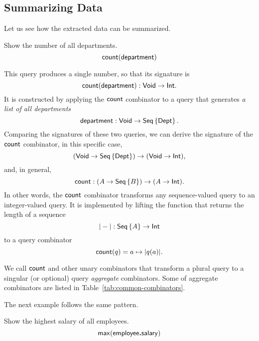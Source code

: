 \subsection*{Summarizing Data}

Let us see how the extracted data can be summarized.

\begin{demo}
    \label{ex:count-department}
    Show the number of all departments.
    \begin{equation*}
        \textup{\textsf{count}}(\textup{\textsf{department}})
    \end{equation*}
\end{demo}

This query produces a single number, so that its signature is
\begin{equation*}
    \textup{\textsf{count}}(\textup{\textsf{department}}) : \textup{\textsf{Void}} \to \textup{\textsf{Int}}.
\end{equation*}
It is constructed by applying the $\textup{\textsf{count}}$ combinator to a query that generates
\emph{a list of all departments}
\begin{equation*}
    \textup{\textsf{department}} : \textup{\textsf{Void}} \to \textup{\textsf{Seq}}\left\{\textup{\textsf{Dept}}\right\}.
\end{equation*}
Comparing the signatures of these two queries, we can derive the signature of
the $\textup{\textsf{count}}$ combinator, in this specific case,
\begin{equation*}
    (\textup{\textsf{Void}} \to \textup{\textsf{Seq}}\left\{\textup{\textsf{Dept}}\right\}) \to (\textup{\textsf{Void}} \to \textup{\textsf{Int}}),
\end{equation*}
and, in general,
\begin{equation*}
    \textup{\textsf{count}}: (A \to \textup{\textsf{Seq}}\left\{B\right\}) \to (A \to \textup{\textsf{Int}}).
\end{equation*}
In other words, the $\textup{\textsf{count}}$ combinator transforms any sequence-valued query
to an integer-valued query.  It is implemented by lifting the function that
returns the length of a sequence
\begin{equation*}
    |-| : \textup{\textsf{Seq}}\left\{A\right\} \to \textup{\textsf{Int}}
\end{equation*}
to a query combinator
\begin{equation*}
    \textup{\textsf{count}}(q) = a \mapsto |q(a)|.
\end{equation*}

We call $\textup{\textsf{count}}$ and other unary combinators that transform a plural query to a
singular (or optional) query \emph{aggregate} combinators.  Some of aggregate
combinators are listed in Table~\ref{tab:common-combinators}.

The next example follows the same pattern.

\begin{demo}
    \label{ex:max-employee-salary}
    Show the highest salary of all employees.
    \begin{equation*}
        \textup{\textsf{max}}(\textup{\textsf{employee}}\boldsymbol{.}\textup{\textsf{salary}})
    \end{equation*}
\end{demo}

